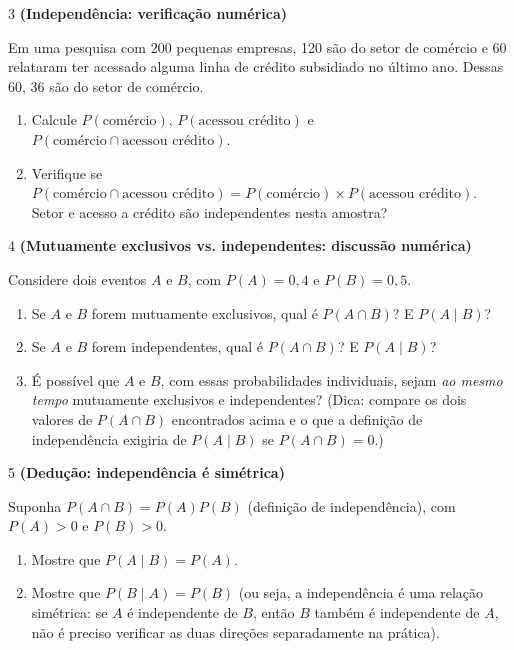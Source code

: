 \documentclass[11pt]{article}
\begin{document}
\begin{questao}{3} \textbf{(Independência: verificação numérica)}

Em uma pesquisa com 200 pequenas empresas, 120 são do setor de comércio e 60 relataram ter
acessado alguma linha de crédito subsidiado no último ano. Dessas 60, 36 são do setor de comércio.

\begin{enumerate}[label=(\alph*)]
  \item Calcule $P(\text{comércio})$, $P(\text{acessou crédito})$ e
    $P(\text{comércio}\cap\text{acessou crédito})$.
  \item Verifique se $P(\text{comércio}\cap\text{acessou crédito}) = P(\text{comércio}) \times
    P(\text{acessou crédito})$. Setor e acesso a crédito são independentes nesta amostra?
\end{enumerate}
\end{questao}

\begin{questao}{4} \textbf{(Mutuamente exclusivos vs. independentes: discussão numérica)}

Considere dois eventos $A$ e $B$, com $P(A)=0{,}4$ e $P(B)=0{,}5$.

\begin{enumerate}[label=(\alph*)]
  \item Se $A$ e $B$ forem mutuamente exclusivos, qual é $P(A\cap B)$? E $P(A\mid B)$?
  \item Se $A$ e $B$ forem independentes, qual é $P(A\cap B)$? E $P(A\mid B)$?
  \item É possível que $A$ e $B$, com essas probabilidades individuais, sejam \emph{ao mesmo
    tempo} mutuamente exclusivos e independentes? (Dica: compare os dois valores de $P(A\cap B)$
    encontrados acima e o que a definição de independência exigiria de $P(A\mid B)$ se
    $P(A\cap B)=0$.)
\end{enumerate}
\end{questao}

\begin{questao}{5} \textbf{(Dedução: independência é simétrica)}

Suponha $P(A\cap B) = P(A)P(B)$ (definição de independência), com $P(A)>0$ e $P(B)>0$.

\begin{enumerate}[label=(\alph*)]
  \item Mostre que $P(A\mid B) = P(A)$.
  \item Mostre que $P(B\mid A) = P(B)$ (ou seja, a independência é uma relação simétrica: se $A$
    é independente de $B$, então $B$ também é independente de $A$, não é preciso verificar as
    duas direções separadamente na prática).
\end{enumerate}
\end{questao}
\end{document}
